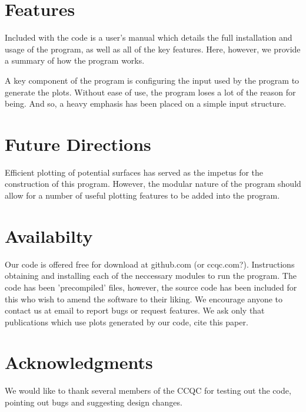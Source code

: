 \documentclass{article}
\begin{document}
\section{Features}

Included with the code is a user's manual which details the full installation and usage of the program, as well as all of the key features. Here, however, we provide a summary of how the program works.

A key component of the program is configuring the input used by the program to generate the plots. Without ease of use, the program loses a lot of the reason for being. And so, a heavy emphasis has been placed on a simple input structure.   

\section{Future Directions}

Efficient plotting of potential surfaces has served as the impetus for the construction of this program. However, the modular nature of the program should allow for a number of useful plotting features to be added into the program. 

\section{Availabilty}

Our code is offered free for download at github.com (or ccqc.com?). Instructions obtaining and installing each of the neccessary modules to run the program. The code has been 'precompiled' files, however, the source code has been included for this who wish to amend the software to their liking. We encourage anyone to contact us at email to report bugs or request features. We ask only that publications which use plots  generated by our code, cite this paper.

\section{Acknowledgments}

We would like to thank several members of the CCQC for testing out the code, pointing out bugs and suggesting design changes.

%
%
\end{document}
